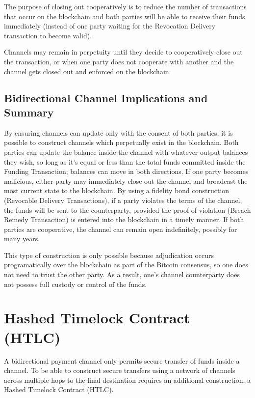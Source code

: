 \documentclass[letterpaper,11pt]{article}
\begin{document}
The purpose of closing out cooperatively is to reduce the number of
transactions that occur on the blockchain and both parties will be able to
receive their funds immediately (instead of one party waiting for the
Revocation Delivery transaction to become valid).

Channels may remain in perpetuity until they decide to cooperatively close out
the transaction, or when one party does not cooperate with another and the
channel gets closed out and enforced on the blockchain.

\subsection{Bidirectional Channel Implications and Summary}

By ensuring channels can update only with the consent of both parties, it is
possible to construct channels which perpetually exist in the blockchain. Both
parties can update the balance inside the channel with whatever output balances
they wish, so long as it's equal or less than the total funds committed inside
the Funding Transaction; balances can move in both directions. If one party
becomes malicious, either party may immediately close out the channel and
broadcast the most current state to the blockchain. By using a fidelity bond
construction (Revocable Delivery Transactions), if a party violates the terms of
the channel, the funds will be sent to the counterparty, provided the proof of
violation (Breach Remedy Transaction) is entered into the blockchain in a timely
manner. If both parties are cooperative, the channel can remain open
indefinitely, possibly for many years.

This type of construction is only possible because adjudication occurs
programatically over the blockchain as part of the Bitcoin consensus, so one
does not need to trust the other party. As a result, one's channel counterparty
does not possess full custody or control of the funds.

\section{Hashed Timelock Contract (HTLC)}

A bidirectional payment channel only permits secure transfer of funds inside a
channel. To be able to construct secure transfers using a network of channels
across multiple hops to the final destination requires an additional
construction, a Hashed Timelock Contract (HTLC).
\end{document}
